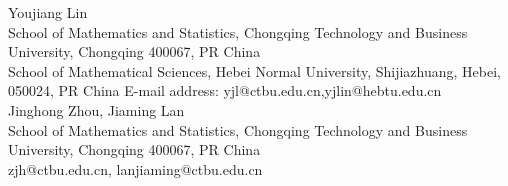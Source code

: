 \documentclass[preprint,12pt]{elsarticle}
\begin{document}
\noindent Youjiang Lin\\
\noindent\small  School of Mathematics and Statistics, Chongqing Technology and Business University, Chongqing 400067, PR China\\
\noindent\small{ School of Mathematical Sciences, Hebei Normal University, Shijiazhuang, Hebei,
050024, PR China} 
E-mail address: yjl@ctbu.edu.cn,yjlin@hebtu.edu.cn\\

\noindent Jinghong Zhou, Jiaming Lan\\
\noindent\small  School of Mathematics and Statistics, Chongqing Technology and Business University, Chongqing 400067, PR China\\
\noindent\small{ zjh@ctbu.edu.cn, lanjiaming@ctbu.edu.cn}\\
\end{document}
